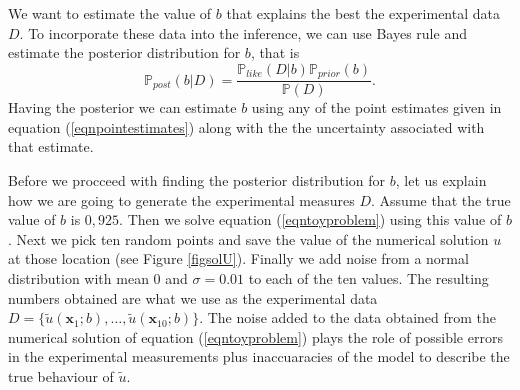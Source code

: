 \documentclass[12pt]{book}
\newcommand{\post}{\mathbb{P}_{post}}
\newcommand{\like}{\mathbb{P}_{like}}
\newcommand{\prior}{\mathbb{P}_{prior}}
\newcommand{\p}{\mathbb{P}}
\newcommand{\x}{\textbf{x}}
\begin{document}
We want to estimate the value of $b$ that explains the best the experimental data $D$. 
To incorporate these data into the inference, 
we can use Bayes rule and estimate the posterior distribution for $b$, that is
\begin{equation}\label{eqnpropto}
\post(b|D)=\frac{\like(D|b)\prior(b)}{\p(D)}.
\end{equation}
Having the posterior we can estimate $b$ using any of the point estimates given in equation (\ref{eqnpointestimates}) along
with the  the uncertainty associated with that estimate.

Before we procceed  with finding the posterior distribution for $b$, let us explain how we are going to generate the experimental measures $D$. 
Assume that the true value of $b$ is $0,925$. Then we solve equation (\ref{eqntoyproblem})
using this value of $b$. Next we pick  ten random points and save the value of the numerical 
solution $u$ at those location (see Figure \ref{figsolU}).  Finally we add  noise from
a normal distribution with mean $0$ and $\sigma=0.01$ to each  of the ten values. The resulting numbers obtained are what we use
as the experimental data $D=\{\tilde{u}(\x_{1};b),\ldots,\tilde{u}(\x_{10};b)\}$. The noise added to the data obtained from the
numerical  solution of equation
(\ref{eqntoyproblem}) plays the role of possible  errors in the experimental measurements plus inaccuaracies of the 
model to describe the true behaviour of $\tilde{u}$.
\end{document}
